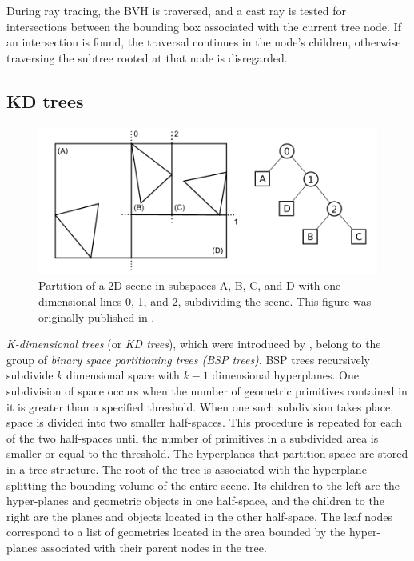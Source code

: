 During ray tracing, the BVH is traversed, and a cast ray is tested for intersections between the bounding box associated with the current tree node. If an intersection is found, the traversal continues in the node's children, otherwise traversing the subtree rooted at that node is disregarded.


\subsection{KD trees}

\begin{figure}
	\centering
	\includegraphics[width=1\linewidth]{img/1 fundamentals/kd_tree.png}
	\caption{Partition of a 2D scene in subspaces A, B, C, and D with one-dimensional lines 0, 1, and 2, subdividing the scene. This figure was originally published in \cite{hapala2011kd}.}
	\label{fig:kdtree}
\end{figure}

\emph{K-dimensional trees} (or \emph{KD trees}), which were introduced by \cite{bentley1975multidimensional}, belong to the group of \emph{binary space partitioning trees (BSP trees)}. BSP trees recursively subdivide $k$ dimensional space with $k-1$ dimensional hyperplanes. One subdivision of space occurs when the number of geometric primitives contained in it is greater than a specified threshold. When one such subdivision takes place, space is divided into two smaller half-spaces. This procedure is repeated for each of the two half-spaces until the number of primitives in a subdivided area is smaller or equal to the threshold. The hyperplanes that partition space are stored in a tree structure. The root of the tree is associated with the hyperplane splitting the bounding volume of the entire scene. Its children to the left are the hyper-planes and geometric objects in one half-space, and the children to the right are the planes and objects located in the other half-space. The leaf nodes correspond to a list of geometries located in the area bounded by the hyper-planes associated with their parent nodes in the tree.

